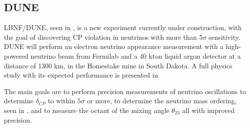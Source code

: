 \subsection{DUNE}
LBNF/DUNE\cite{23DUNE}, seen in , is a new experiment currently under construction, with the goal of discovering CP violation in neutrinos with more than 5$\sigma$ sensitivity. DUNE will perform an electron neutrino appearance measurement with a high-powered neutrino beam from Fermilab and a 40 kton liquid argon detector at a distance of 1300 km, in the Homestake mine in South Dakota. A full physics study with its expected performance is presented in~\cite{76Dune}

The main goals are to perform precision measurements of neutrino oscillations to determine $\delta_{CP}$ to within $5\sigma$ or more, to determine the neutrino mass ordering, seen in , and to measure the octant of the mixing angle $\theta_{23}$ all with improved precision.

